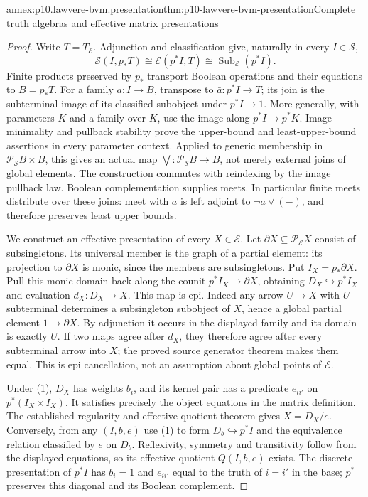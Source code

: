 \begin{annexitem}{annex:p10.lawvere-bvm.presentation}{thm:p10-lawvere-bvm-presentation}{Complete truth algebras and effective matrix presentations}
\begin{proof}
Write \(T=T_{\mathcal E}\). Adjunction and classification give,
naturally in every \(I\in\mathcal S\),
\[
 \mathcal S(I,p_*T)\cong\mathcal E(p^*I,T)
              \cong\operatorname{Sub}_{\mathcal E}(p^*I).
\tag{1}
\]
Finite products preserved by \(p_*\) transport Boolean operations
and their equations to \(B=p_*T\). For a family \(a:I\to B\),
transpose to \(\bar a:p^*I\to T\); its join is the subterminal
image of its classified subobject under \(p^*I\to1\). More
generally, with parameters \(K\) and a family over \(K\), use
the image along \(p^*I\to p^*K\). Image minimality and pullback
stability prove the upper-bound and least-upper-bound assertions in
every parameter context. Applied to generic membership in
\(\mathcal P_{\mathcal S}B\times B\), this gives an actual
map \(\bigvee:\mathcal P_{\mathcal S}B\to B\), not merely
external joins of global elements. The construction commutes with
reindexing by the image pullback law. Boolean complementation supplies
meets. In particular finite meets distribute over these joins: meet
with \(a\) is left adjoint to \(\neg a\vee(-)\), and therefore
preserves least upper bounds.

We construct an effective presentation of every \(X\in\mathcal E\).
Let \(\partial X\subseteq\mathcal P_{\mathcal E}X\) consist of
subsingletons. Its universal member is the graph of a partial element:
its projection to \(\partial X\) is monic, since the members are
subsingletons. Put \(I_X=p_*\partial X\). Pull this monic
domain back along the counit \(p^*I_X\to\partial X\), obtaining
\(D_X\hookrightarrow p^*I_X\) and evaluation \(d_X:D_X\to X\).
This map is epi. Indeed any arrow \(U\to X\) with \(U\)
subterminal determines a subsingleton subobject of \(X\), hence a
global partial element \(1\to\partial X\). By adjunction it
occurs in the displayed family and its domain is exactly \(U\).
If two maps agree after \(d_X\), they therefore agree after every
subterminal arrow into \(X\); the proved source generator theorem
makes them equal. This is epi cancellation, not an assumption about
global points of \(\mathcal E\).

Under (1), \(D_X\) has weights \(b_i\), and its kernel pair
has a predicate \(e_{ii'}\) on \(p^*(I_X\times I_X)\).
It satisfies precisely the object equations in the matrix definition.
The established regularity and effective quotient theorem gives
\(X=D_X/e\). Conversely, from any \((I,b,e)\) use (1) to form
\(D_b\hookrightarrow p^*I\) and the equivalence relation classified
by \(e\) on \(D_b\). Reflexivity, symmetry and transitivity follow
from the displayed equations, so its effective quotient \(Q(I,b,e)\)
exists. The discrete presentation of \(p^*I\) has \(b_i=1\)
and \(e_{ii'}\) equal to the truth of \(i=i'\) in the base;
\(p^*\) preserves this diagonal and its Boolean complement.


\end{proof}
\end{annexitem}
